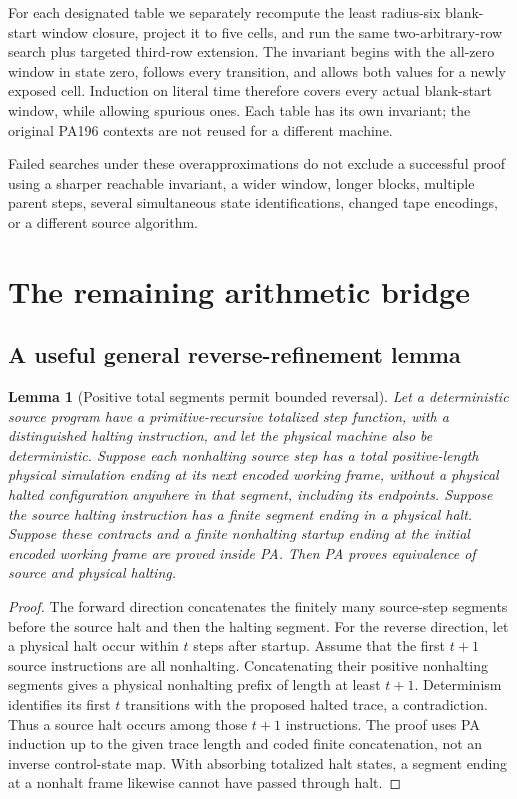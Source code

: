 \documentclass[11pt,letterpaper]{article}
\newtheorem{lemma}[theorem]{Lemma}
\begin{document}
For each designated table we separately recompute the least radius-six
blank-start window closure, project it to five cells, and run the same
two-arbitrary-row search plus targeted third-row extension. The invariant
begins with the all-zero window in state zero, follows every transition,
and allows both values for a newly exposed cell. Induction on literal time
therefore covers every actual blank-start window, while allowing spurious
ones. Each table has its own invariant; the original PA196 contexts are
not reused for a different machine.



Failed searches under these overapproximations do not exclude a successful
proof using a sharper reachable invariant, a wider window, longer blocks,
multiple parent steps, several simultaneous state identifications, changed
tape encodings, or a different source algorithm.

\section{The remaining arithmetic bridge}

\subsection{A useful general reverse-refinement lemma}

\begin{lemma}[Positive total segments permit bounded reversal]
Let a deterministic source program have a primitive-recursive totalized
step function, with a distinguished halting instruction, and let the
physical machine also be deterministic. Suppose each
nonhalting source step has a total positive-length physical simulation
ending at its next encoded working frame, without a physical halted
configuration anywhere in that segment, including its endpoints. Suppose
the source halting instruction has a finite segment ending in a physical
halt. Suppose these contracts and a finite nonhalting startup ending at the
initial encoded working frame are proved inside PA. Then PA proves
equivalence of source and physical halting.
\end{lemma}
\begin{proof}
The forward direction concatenates the finitely many source-step segments
before the source halt and then the halting segment. For the reverse
direction, let a physical halt occur within $t$ steps after startup.
Assume that the first $t+1$ source instructions are all nonhalting. Concatenating
their positive nonhalting segments gives a physical nonhalting prefix of
length at least $t+1$. Determinism identifies its first $t$ transitions with
the proposed halted trace, a contradiction. Thus a source halt occurs
among those $t+1$ instructions. The proof uses PA induction up to the given
trace length and coded
finite concatenation, not an inverse control-state map. With absorbing
totalized halt states, a segment ending at a nonhalt frame likewise cannot
have passed through halt.
\end{proof}
\end{document}
